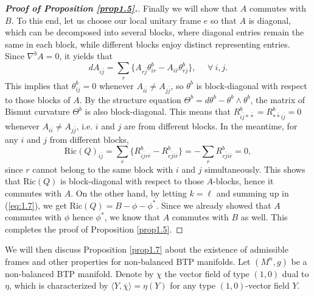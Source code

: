 \documentclass{amsart}
\numberwithin{equation}{section}
\theoremstyle{definition}
\renewcommand{\1}{\mathds{1}}
\renewcommand{\>}{\rightarrow}
\begin{document}
\begin{proof}[{\bf Proof of Proposition \ref{prop1.5}.}]
Finally we will show that $A$ commutes with $B$.
To this end, let us choose our local unitary frame $e$ so that $A$ is diagonal, which can be decomposed into
several blocks, where diagonal entries remain the same in each block, while different blocks enjoy distinct representing entries.
Since $\nabla^b A=0$, it yields that
$$ d A_{i\bar{j}} = \sum_r \{  A_{r\bar{j}} \theta^b_{ir} - A_{i\bar{r}} \theta^b_{rj} \} , \ \ \ \ \ \ \forall \  i,j. $$
This implies that $\theta^b_{ij}=0$ whenever $A_{i\bar{i}} \neq A_{j\bar{j}}$,
so $\theta^b$ is block-diagonal with respect to those blocks of $A$.
By the structure equation $\Theta^b=d\theta^b - \theta^b\wedge \theta^b$,
the matrix of Bismut curvature $\Theta^b$ is also block-diagonal.
This means that $R^b_{i\bar{j}\ast \bar{\ast}} = R^b_{\ast \bar{\ast}i\bar{j}} =0$
whenever $A_{i\bar{i}} \neq A_{j\bar{j}}$, i.e. $i$ and $j$ are from different blocks.
In the meantime, for any $i$ and $j$ from different blocks,
$$ \mathrm{Ric}(Q)_{i \bar{j}} = \sum_r \big\{ R^b_{i\bar{j}r\bar{r}} - R^b_{r\bar{j}i\bar{r}} \big\} = - \sum_r R^b_{r\bar{j}i\bar{r}} =0,$$
since $r$ cannot belong to the same block with $i$ and $j$ simultaneously.
This shows that $\mathrm{Ric}(Q)$ is block-diagonal with respect to those $A$-blocks, hence it commutes with $A$.
On the other hand, by letting $k=\ell$ and summing up in (\ref{eq:1.7}), we get $\mathrm{Ric}(Q)=B-\phi -\phi^{\ast}$.
Since we already showed that $A$ commutes with $\phi$ hence $\phi^{\ast}$, we know that $A$ commutes with $B$ as well.
This completes the proof of Proposition \ref{prop1.5}.
\end{proof}

We will then discuss Proposition \ref{prop1.7} about the existence of admissible frames and
other properties for non-balanced BTP manifolds. Let $(M^n,g)$ be a non-balanced BTP manifold.
Denote by $\chi$ the vector field of type $(1,0)$  dual to $\eta$, which is characterized by
$\langle Y, \overline{\chi } \rangle =\eta (Y)$ for any type $(1,0)$-vector field $Y$.
\end{document}
